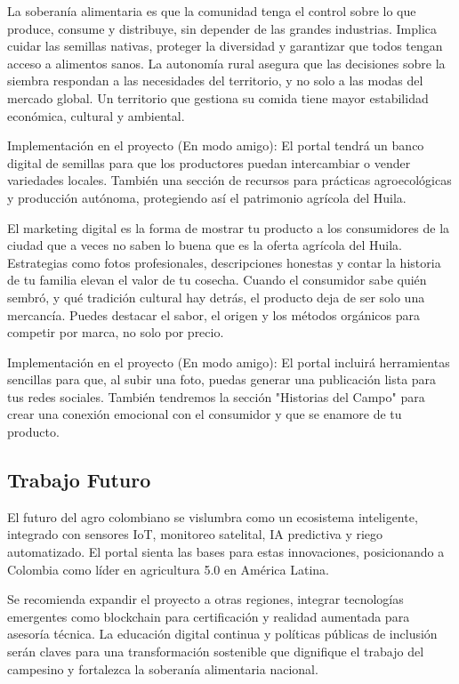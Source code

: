 La soberanía alimentaria es que la comunidad tenga el control sobre lo que produce, consume y distribuye, sin depender de las grandes industrias. Implica cuidar las semillas nativas, proteger la diversidad y garantizar que todos tengan acceso a alimentos sanos. La autonomía rural asegura que las decisiones sobre la siembra respondan a las necesidades del territorio, y no solo a las modas del mercado global. Un territorio que gestiona su comida tiene mayor estabilidad económica, cultural y ambiental.

Implementación en el proyecto (En modo amigo): El portal tendrá un banco digital de semillas para que los productores puedan intercambiar o vender variedades locales. También una sección de recursos para prácticas agroecológicas y producción autónoma, protegiendo así el patrimonio agrícola del Huila.

El marketing digital es la forma de mostrar tu producto a los consumidores de la ciudad que a veces no saben lo buena que es la oferta agrícola del Huila. Estrategias como fotos profesionales, descripciones honestas y contar la historia de tu familia elevan el valor de tu cosecha. Cuando el consumidor sabe quién sembró, y qué tradición cultural hay detrás, el producto deja de ser solo una mercancía. Puedes destacar el sabor, el origen y los métodos orgánicos para competir por marca, no solo por precio.

Implementación en el proyecto (En modo amigo): El portal incluirá herramientas sencillas para que, al subir una foto, puedas generar una publicación lista para tus redes sociales. También tendremos la sección "Historias del Campo" para crear una conexión emocional con el consumidor y que se enamore de tu producto.

\subsection{Trabajo Futuro}
El futuro del agro colombiano se vislumbra como un ecosistema inteligente, integrado con sensores IoT, monitoreo satelital, IA predictiva y riego automatizado. El portal sienta las bases para estas innovaciones, posicionando a Colombia como líder en agricultura 5.0 en América Latina.

Se recomienda expandir el proyecto a otras regiones, integrar tecnologías emergentes como blockchain para certificación y realidad aumentada para asesoría técnica. La educación digital continua y políticas públicas de inclusión serán claves para una transformación sostenible que dignifique el trabajo del campesino y fortalezca la soberanía alimentaria nacional.


